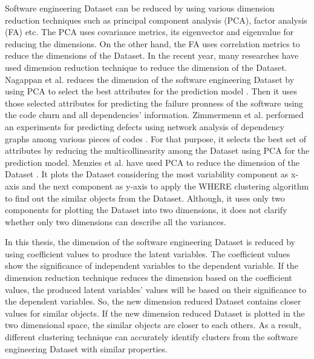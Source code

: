 \documentclass[12pt]{report}
\begin{document}
Software engineering Dataset can be reduced by using various dimension reduction techniques such as principal component analysis (PCA), factor analysis (FA) etc. The PCA uses covariance metrics, its eigenvector and eigenvalue for reducing the dimensions. On the other hand, the FA uses correlation metrics to reduce the dimensions of the Dataset. In the recent year, many researches have used dimension reduction technique to reduce the dimension of the Dataset. Nagappan et al. reduces the dimension of the software engineering Dataset by using PCA to select the best attributes for the prediction model \cite{nagappan2005use,nagappan2006mining,nagappan2007using}. Then it uses those selected attributes for predicting the failure pronness of the software using the code churn and all dependencies' information. Zimmermenn et al. performed an experiments for predicting defects using network analysis of dependency graphs among various pieces of codes \cite{zimmermann2008predicting}. For that purpose, it selects the best set of attributes by reducing the multicollinearity among the Dataset using PCA for the prediction model. Menzies et al. have used PCA to reduce the dimension of the Dataset \cite{menzies2011local,menzies2013local}. It plots the Dataset considering the most variability component as x-axis and the next component as y-axis to apply the WHERE clustering algorithm to find out the similar objects from the Dataset. Although, it uses only two components for plotting the Dataset into two dimensions, it does not clarify whether only two dimensions can describe all the variances.




In this thesis, the dimension of the software engineering Dataset is reduced by using coefficient values  to produce the latent variables. The coefficient values show the significance of independent variables to the dependent variable. If the dimension reduction technique reduces the dimension based on the coefficient values, the produced latent variables' values will be based on their significance to the dependent variables. So, the new dimension reduced Dataset contains closer values for similar objects. If the new dimension reduced Dataset is plotted in the two dimensional space, the similar objects are closer to each others. As a result, different clustering technique can accurately identify clusters from the software engineering Dataset with similar properties.
\end{document}
